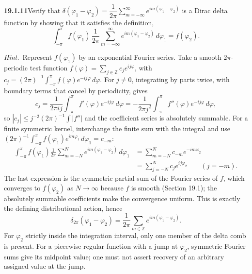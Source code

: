 \par\bigskip
\noindent\textbf{19.1.11}\quad Verify that
$\delta(\varphi_{1}-\varphi_{2})=\dfrac{1}{2\pi}
\displaystyle\sum_{m=-\infty}^{\infty}e^{im(\varphi_{1}-\varphi_{2})}$
is a Dirac delta function by showing that it satisfies the
definition,
\[
\int_{-\pi}^{\pi}f(\varphi_{1})\,\frac{1}{2\pi}
\sum_{m=-\infty}^{\infty}e^{im(\varphi_{1}-\varphi_{2})}\,d\varphi_{1}
=f(\varphi_{2}).
\]
\par\emph{Hint.}~Represent $f(\varphi_{1})$ by an exponential
Fourier series.
\solution
{}
Take a smooth $2\pi$-periodic test function
$f(\varphi)=\sum_{j\in\mathbb Z}c_je^{ij\varphi}$, with
$c_j=(2\pi)^{-1}\int_{-\pi}^{\pi}f(\varphi)e^{-ij\varphi}\,d\varphi$.
For $j\ne0$, integrating by parts twice, with boundary terms that cancel
by periodicity, gives
\[
c_j=\frac1{2\pi ij}\int_{-\pi}^{\pi}f'(\varphi)e^{-ij\varphi}\,d\varphi
=-\frac1{2\pi j^2}\int_{-\pi}^{\pi}f''(\varphi)e^{-ij\varphi}\,d\varphi,
\]
so $|c_j|\le j^{-2}(2\pi)^{-1}\int|f''|$ and the coefficient series is
absolutely summable. For a finite symmetric kernel, interchange the
finite sum with the integral and use
$(2\pi)^{-1}\int_{-\pi}^{\pi}f(\varphi_1)e^{im\varphi_1}\,d\varphi_1=c_{-m}$:
\begin{align*}
\int_{-\pi}^{\pi}f(\varphi_1)\frac1{2\pi}
 \sum_{m=-N}^Ne^{im(\varphi_1-\varphi_2)}\,d\varphi_1
&=\sum_{m=-N}^Nc_{-m}e^{-im\varphi_2}\\
&=\sum_{j=-N}^Nc_je^{ij\varphi_2}\qquad(j=-m).
\end{align*}
The last expression is the symmetric partial sum of the Fourier series
of $f$, which converges to $f(\varphi_2)$ as $N\to\infty$ because $f$ is
smooth (Section 19.1); the absolutely summable coefficients make the
convergence uniform. This is exactly the defining distributional action,
hence
\[
\boxed{\delta_{2\pi}(\varphi_1-\varphi_2)
=\frac1{2\pi}\sum_{m\in\mathbb Z}e^{im(\varphi_1-\varphi_2)}.}
\]
For $\varphi_2$ strictly inside the integration interval, only one member
of the delta comb is present. For a piecewise regular function with a
jump at $\varphi_2$, symmetric Fourier sums give its midpoint value;
one must not assert recovery of an arbitrary assigned value at the jump.

